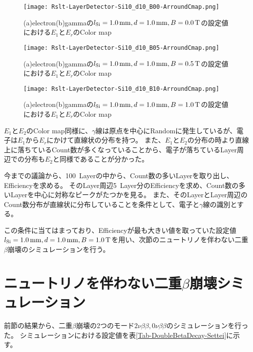 \documentclass[a4paper,10pt]{jreport}
\begin{document}
\begin{figure}[H]
	\center
	\texttt{[image: Rslt-LayerDetector-Si10\_d10\_B00-ArroundCmap.png]}
	\caption{(a)electron(b)gammaの$l_{\rm{Si}}=\SI{1.0}{mm}, d=\SI{1.0}{mm}, B=\SI{0.0}{T}$の設定値における$E_1$と$E_r$のColor map}
	\label{Rslt-LayerDetector-Si10_d10_B00-ArroundCmap}
\end{figure}

\begin{figure}[H]
	\center
	\texttt{[image: Rslt-LayerDetector-Si10\_d10\_B05-ArroundCmap.png]}
	\caption{(a)electron(b)gammaの$l_{\rm{Si}}=\SI{1.0}{mm}, d=\SI{1.0}{mm}, B=\SI{0.5}{T}$の設定値における$E_1$と$E_r$のColor map}
	\label{Rslt-LayerDetector-Si10_d10_B05-ArroundCmap}
\end{figure}

\begin{figure}[H]
	\center
	\texttt{[image: Rslt-LayerDetector-Si10\_d10\_B10-ArroundCmap.png]}
	\caption{(a)electron(b)gammaの$l_{\rm{Si}}=\SI{1.0}{mm}, d=\SI{1.0}{mm}, B=\SI{1.0}{T}$の設定値における$E_1$と$E_r$のColor map}
	\label{Rslt-LayerDetector-Si05_d05_B00-ArroundCmap}
\end{figure}

$E_1$と$E_2$のColor map同様に、$\gamma$線は原点を中心にRandomに発生しているが、電子は$E_1$から$E_r$にかけて直線状の分布を持つ。
また、$E_1$と$E_2$の分布の時より直線上に落ちているCount数が多くなっていることから、電子が落ちているLayer周辺での分布も$E_2$と同様であることが分かった。

今までの議論から、\SI{100}{Layer}の中から、Count数の多いLayerを取り出し、Efficiencyを求める。
そのLayer周辺\SI{5}{Layer}分のEfficiencyを求め、Count数の多いLayerを中心に対称なピークがたつかを見る。
また、そのLayerとLayer周辺のCount数分布が直線状に分布していることを条件として、電子と$\gamma$線の識別とする。

この条件に当てはまっており、Efficiencyが最も大きい値を取っていた設定値$l_{\rm{Si}}=\SI{1.0}{mm},d=\SI{1.0}{mm},B=\SI{1.0}{T}$を用い、次節のニュートリノを伴わない二重$\beta$崩壊のシミュレーションを行う。



\section{ニュートリノを伴わない二重$\beta$崩壊シミュレーション}

前節の結果から、二重$\beta$崩壊の2つのモード$2\nu\beta\beta,0\nu\beta\beta$のシミュレーションを行った。
シミュレーションにおける設定値を表\ref{Tab-DoubleBetaDecay-Settei}に示す。
\end{document}
